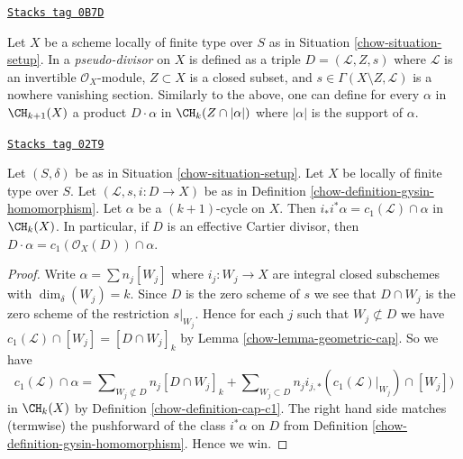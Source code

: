 \begin{remark}
\label{chow-remark-generalize-to-pseudo-divisor}
\href{https://stacks.math.columbia.edu/tag/0B7D}{\texttt{Stacks tag 0B7D}}

Let $X$ be a scheme locally of finite type over $S$ as in
Situation \ref{chow-situation-setup}. In \cite{F} a {\it pseudo-divisor} on $X$
is defined as a triple $D = (\mathcal{L}, Z, s)$ where $\mathcal{L}$
is an invertible $\mathcal{O}_X$-module, $Z \subset X$ is a closed subset,
and $s \in \Gamma(X \setminus Z, \mathcal{L})$ is a nowhere vanishing
section. Similarly to the above, one can define for every $\alpha$
in $\CH_{k + 1}(X)$ a product $D \cdot \alpha$ in $\CH_k(Z \cap |\alpha|)$
where $|\alpha|$ is the support of $\alpha$.
\end{remark}

\begin{lemma}
\label{chow-lemma-support-cap-effective-Cartier}
\href{https://stacks.math.columbia.edu/tag/02T9}{\texttt{Stacks tag 02T9}}

Let $(S, \delta)$ be as in Situation \ref{chow-situation-setup}. Let $X$ be locally
of finite type over $S$. Let $(\mathcal{L}, s, i : D \to X)$ be as in
Definition \ref{chow-definition-gysin-homomorphism}. Let $\alpha$ be a
$(k + 1)$-cycle on $X$. Then $i_*i^*\alpha = c_1(\mathcal{L}) \cap \alpha$
in $\CH_k(X)$. In particular, if $D$ is an effective Cartier divisor, then
$D \cdot \alpha = c_1(\mathcal{O}_X(D)) \cap \alpha$.
\end{lemma}

\begin{proof}

Write $\alpha = \sum n_j[W_j]$ where $i_j : W_j \to X$ are integral closed
subschemes with $\dim_\delta(W_j) = k$.
Since $D$ is the zero scheme of $s$ we see that $D \cap W_j$ is the zero scheme
of the restriction $s|_{W_j}$. Hence for each $j$ such that
$W_j \not \subset D$ we have
$c_1(\mathcal{L}) \cap [W_j] = [D \cap W_j]_k$
by Lemma \ref{chow-lemma-geometric-cap}. So we have
$$
c_1(\mathcal{L}) \cap \alpha
=
\sum\nolimits_{W_j \not \subset D} n_j[D \cap W_j]_k
+
\sum\nolimits_{W_j \subset D}
n_j i_{j, *}(c_1(\mathcal{L})|_{W_j}) \cap [W_j])
$$
in $\CH_k(X)$ by Definition \ref{chow-definition-cap-c1}.
The right hand side matches (termwise) the pushforward of the class
$i^*\alpha$ on $D$ from Definition \ref{chow-definition-gysin-homomorphism}.
Hence we win.
\end{proof}

